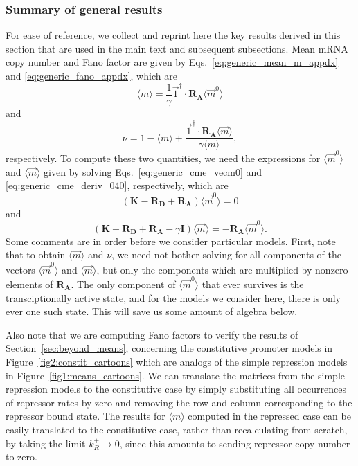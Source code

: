 \subsubsection{Summary of general results}
For ease of reference, we collect and reprint here the key results derived in
this section that are used in the main text and subsequent subsections. Mean
mRNA copy number and Fano factor are given by Eqs.~\ref{eq:generic_mean_m_appdx}
and \ref{eq:generic_fano_appdx}, which are
\begin{equation}
\langle{m}\rangle
= \frac{1}{\gamma} \vec{1}^\dagger\cdot\mathbf{R_A}\langle\vec{m}^0\rangle
\label{eq:mean_m_appdx_ref}
\end{equation}
and
\begin{equation}
\nu = 1 - \langle{m}\rangle
+ \frac{\vec{1}^\dagger\cdot \mathbf{R_A}\langle\vec{m}\rangle}
        {\gamma \langle{m}\rangle},
\label{eq:fano_appdx_ref}
\end{equation}
respectively. To compute these two quantities, we need the expressions for
$\langle\vec{m}^0\rangle$ and $\langle\vec{m}\rangle$ given by solving
Eqs.~\ref{eq:generic_cme_vecm0} and \ref{eq:generic_cme_deriv_040},
respectively, which are
\begin{equation}
(\mathbf{K} - \mathbf{R_D} + \mathbf{R_A}) \langle\vec{m}^0\rangle = 0
\label{eq:vecm0_appdx_ref}
\end{equation}
and
\begin{equation}
(\mathbf{K} - \mathbf{R_D}
+ \mathbf{R_A} - \gamma\mathbf{I}) \langle\vec{m}\rangle
= - \mathbf{R_A} \langle\vec{m}^0\rangle.
\label{eq:vecm_appdx_ref}
\end{equation}
Some comments are in order before we consider particular models. First, note
that to obtain $\langle\vec{m}\rangle$ and $\nu$, we need not bother solving for
all components of the vectors $\langle\vec{m}^0\rangle$ and
$\langle\vec{m}\rangle$, but only the components which are multiplied by nonzero
elements of $\mathbf{R_A}$. The only component of $\langle\vec{m}^0\rangle$ that
ever survives is the transciptionally active state, and for the models we
consider here, there is only ever one such state. This will save us some amount
of algebra below.

Also note that we are computing Fano factors to verify the results of
Section~\ref{sec:beyond_means}, concerning the constitutive promoter models in
Figure~\ref{fig2:constit_cartoons} which are analogs of the simple repression
models in Figure~\ref{fig1:means_cartoons}. We can translate the matrices from
the simple repression models to the constitutive case by simply substituting all
occurrences of repressor rates by zero and removing the row and column
corresponding to the repressor bound state. The results for $\langle{m}\rangle$
computed in the repressed case can be easily translated to the constitutive
case, rather than recalculating from scratch, by taking the limit
$k_R^+\rightarrow 0$, since this amounts to sending repressor copy number to
zero.


